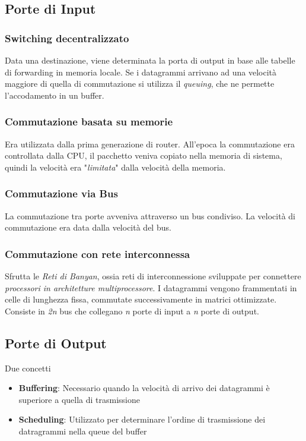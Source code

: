 \documentclass{article}
\begin{document}
        \subsection{Porte di Input}
            \subsubsection{Switching decentralizzato}
                Data una destinazione, viene determinata la porta di output in base alle tabelle di forwarding in memoria locale. Se i datagrammi arrivano ad una velocità maggiore di quella di commutazione si utilizza il \textit{queuing}, che ne permette l'accodamento in un buffer.

            \subsubsection{Commutazione basata su memorie}
                Era utilizzata dalla prima generazione di router. All'epoca la commutazione era controllata dalla CPU, il pacchetto veniva copiato nella memoria di sistema, quindi la velocità era "\textit{limitata}" dalla velocità della memoria.

            \subsubsection{Commutazione via Bus}
                La commutazione tra porte avveniva attraverso un bus condiviso. La velocità di commutazione era data dalla velocità del bus.

            \subsubsection{Commutazione con rete interconnessa}
                Sfrutta le \textit{Reti di Banyan}, ossia reti di interconnessione sviluppate per connettere \textit{processori in architetture multiprocessore}. I datagrammi vengono frammentati in celle di lunghezza fissa, commutate successivamente in matrici ottimizzate.\\
                Consiste in \textit{2n} bus che collegano \textit{n} porte di input a \textit{n} porte di output.

        \subsection{Porte di Output}
            Due concetti
            \begin{itemize}
                \item \textbf{Buffering}: Necessario quando la velocità di arrivo dei datagrammi è superiore a quella di trasmissione
                \item \textbf{Scheduling}: Utilizzato per determinare l'ordine di trasmissione dei datragrammi nella queue del buffer
            \end{itemize}
\end{document}
